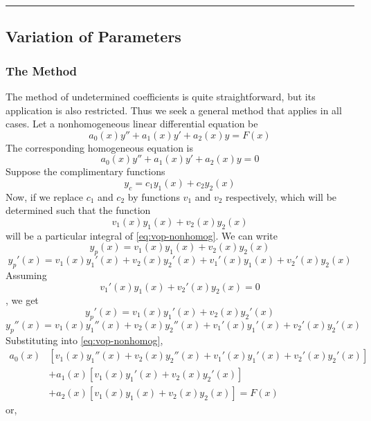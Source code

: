 \vspace{20pt}\rule{3in}{1pt}
\subsection{Variation of Parameters}


\subsubsection{The Method}

The method of undetermined coefficients is quite straightforward, but its application is also restricted. Thus we seek a general method that applies in all cases. Let a nonhomogeneous linear differential equation be
\begin{equation}
    \label{eq:vop-nonhomog}
    \tag{3.4.1}
    a_0(x)y'' + a_1(x)y' + a_2(x)y = F(x)
\end{equation}
The corresponding homogeneous equation is
\begin{equation}
    \label{eq:vop-homog}
    \tag{3.4.2}
    a_0(x)y'' + a_1(x)y' + a_2(x)y = 0
\end{equation}
Suppose the complimentary functions \[
    y_c = c_1y_1(x) + c_2y_2(x)
\]
Now, if we replace $c_1$ and $c_2$ by functions $v_1$ and $v_2$ respectively, which will be determined such that the function
\begin{equation}
    v_1(x)y_1(x) + v_2(x)y_2(x)
\end{equation}
will be a particular integral of \eqref{eq:vop-nonhomog}. We can write \[
    y_p(x) = v_1(x)y_1(x) + v_2(x)y_2(x)
\] \[
    y_p'(x) = v_1(x)y_1'(x) + v_2(x)y_2'(x) + v_1'(x)y_1(x) + v_2'(x)y_2(x)
\] Assuming \[
    v_1'(x)y_1(x) + v_2'(x)y_2(x) = 0
\], we get \[
    y_p'(x) = v_1(x)y_1'(x) + v_2(x)y_2'(x)
\] \[
    y_p''(x) = v_1(x)y_1''(x) + v_2(x)y_2''(x) + v_1'(x)y_1'(x) + v_2'(x)y_2'(x)
\]
Substituting into \eqref{eq:vop-nonhomog},
\begin{equation*}
    \begin{split}
        a_0(x)  &[ v_1(x)y_1''(x) + v_2(x)y_2''(x) + v_1'(x)y_1'(x) + v_2'(x)y_2'(x) ]\\
                & + a_1(x)[ v_1(x)y_1'(x) + v_2(x)y_2'(x) ]\\
                & + a_2(x)[ v_1(x)y_1(x) + v_2(x)y_2(x) ] = F(x)
    \end{split}
\end{equation*} or,
